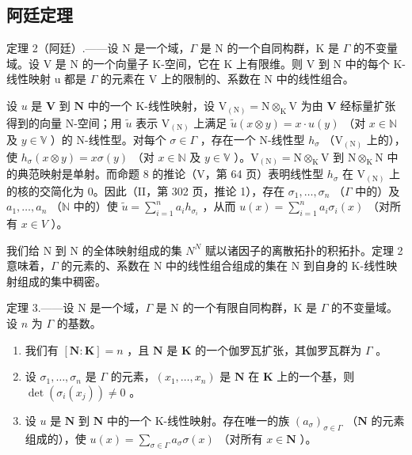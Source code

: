 \subsection{阿廷定理}

定理 2（阿廷）.——设 N 是一个域，\(\Gamma\) 是 N 的一个自同构群，K 是 \(\Gamma\) 的不变量域。设 V 是 N 的一个向量子 K-空间，它在 K 上有限维。则 V 到 N 中的每个 K-线性映射 u 都是 \(\Gamma\) 的元素在 V 上的限制的、系数在 N 中的线性组合。

设 \(u\) 是 \(\mathbf{V}\) 到 \(\mathbf{N}\) 中的一个 K-线性映射，设 \(\mathrm{V}_{(\mathrm{N})} = \mathrm{N} \otimes_{\mathrm{K}} \mathrm{V}\) 为由 \(\mathbf{V}\) 经标量扩张得到的向量 N-空间；用 \(\tilde{u}\) 表示 \(\mathrm{V}_{(\mathrm{N})}\) 上满足 \(\tilde{u}(x \otimes y) = x \cdot u(y)\) （对 \(x \in \mathbb{N}\) 及 \(y \in \mathbb{V}\) ）的 N-线性型。对每个 \(\sigma \in \Gamma\) ，存在一个 N-线性型 \(h_{\sigma}\) （\(\mathrm{V}_{(\mathrm{N})}\) 上的），使 \(h_{\sigma}(x \otimes y) = x \sigma(y)\) （对 \(x \in \mathbb{N}\) 及 \(y \in \mathbb{V}\) ）。\(\mathrm{V}_{(\mathrm{N})} = \mathrm{N} \otimes_{\mathrm{K}} \mathrm{V}\) 到 \(\mathrm{N} \otimes_{\mathrm{K}} \mathrm{N}\) 中的典范映射是单射。而命题 8 的推论（V，第 64 页）表明线性型 \(h_{\sigma}\) 在 \(\mathrm{V}_{(\mathrm{N})}\) 上的核的交简化为 0。因此（II，第 302 页，推论 1），存在 \(\sigma_1, \ldots, \sigma_n\) （\(\Gamma\) 中的）及 \(a_1, \ldots, a_n\) （\(\mathbb{N}\) 中的）使 \(\tilde{u} = \sum_{i=1}^{n} a_i h_{\sigma_i}\) ，从而 \(u(x) = \sum_{i=1}^{n} a_i \sigma_i(x)\) （对所有 \(x \in V\) ）。

我们给 N 到 N 的全体映射组成的集 \(N^{N}\) 赋以诸因子的离散拓扑的积拓扑。定理 2 意味着，\(\Gamma\) 的元素的、系数在 N 中的线性组合组成的集在 N 到自身的 K-线性映射组成的集中稠密。

定理 3.——设 N 是一个域，\(\Gamma\) 是 N 的一个有限自同构群，K 是 \(\Gamma\) 的不变量域。设 \(n\) 为 \(\Gamma\) 的基数。

\begin{enumerate}
\def\labelenumi{\alph{enumi})}
\item
  我们有 \([\mathbf{N}:\mathbf{K}] = n\) ，且 \(\mathbf{N}\) 是 \(\mathbf{K}\) 的一个伽罗瓦扩张，其伽罗瓦群为 \(\Gamma\) 。
\item
  设 \(\sigma_1, \ldots, \sigma_n\) 是 \(\Gamma\) 的元素，\((x_1, \ldots, x_n)\) 是 \(\mathbf{N}\) 在 \(\mathbf{K}\) 上的一个基，则 \(\det (\sigma_i(x_j)) \neq 0\) 。
\item
  设 \(u\) 是 \(\mathbf{N}\) 到 \(\mathbf{N}\) 中的一个 K-线性映射。存在唯一的族 \((a_{\sigma})_{\sigma \in \Gamma}\) （\(\mathbf{N}\) 的元素组成的），使 \(u(x) = \sum_{\sigma \in \Gamma} a_{\sigma} \sigma(x)\) （对所有 \(x \in \mathbf{N}\) ）。
\end{enumerate}

